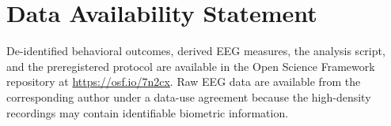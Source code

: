 \section{Data Availability Statement}

De-identified behavioral outcomes, derived EEG measures, the analysis script, and the preregistered protocol are available in the Open Science Framework repository at \url{https://osf.io/7n2cx}. Raw EEG data are available from the corresponding author under a data-use agreement because the high-density recordings may contain identifiable biometric information.
